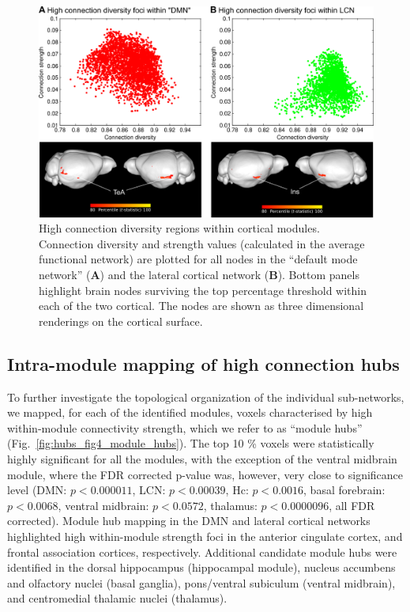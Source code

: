 \begin{figure}[th]
    \centering
    \includegraphics[scale=1.1]{figures/hubs_figure_03_cortical_hubs_NEW.png}
    \decoRule
    \caption[High connection diversity regions within cortical modules.]{High
    connection diversity regions within cortical modules. Connection diversity
    and strength values (calculated in the average functional network) are
    plotted for all nodes in the “default mode network” (\textbf{A}) and the
    lateral cortical network (\textbf{B}). Bottom panels highlight brain nodes
    surviving the top percentage threshold within each of the two cortical. The
    nodes are shown as three dimensional renderings on the cortical surface.}
    \label{fig:hubs_fig3_cortical_hubs}
\end{figure}

\subsection{Intra-module mapping of high connection hubs}

To further investigate the topological organization of the individual
sub-networks, we mapped, for each of the identified modules, voxels
characterised by high within-module connectivity strength, which we refer to as
“module hubs” (Fig.~\ref{fig:hubs_fig4_module_hubs}). The top 10 \% voxels were
statistically highly significant for all the modules, with the exception of the
ventral midbrain module, where the FDR corrected p-value was, however, very
close to significance level (DMN: $p < 0.000011$, LCN: $p < 0.00039$, Hc: $p <
0.0016$, basal forebrain: $p < 0.0068$, ventral midbrain: $p < 0.0572$, thalamus: $p <
0.0000096$, all FDR corrected). Module hub mapping in the DMN and lateral
cortical networks highlighted high within-module strength foci in the anterior
cingulate cortex, and frontal association cortices, respectively. Additional
candidate module hubs were identified in the dorsal hippocampus (hippocampal
module), nucleus accumbens and olfactory nuclei (basal ganglia), pons/ventral
subiculum (ventral midbrain), and centromedial thalamic nuclei (thalamus). 

